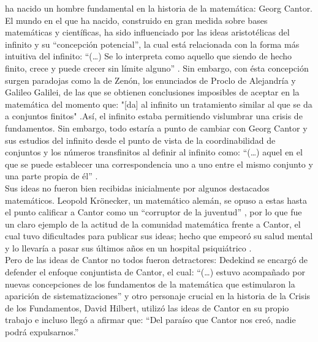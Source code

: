 \documentclass[a4paper,11pt]{article}
\begin{document}
ha nacido un hombre fundamental en la historia de la matemática: Georg Cantor. El mundo en el que ha nacido, construido en gran medida sobre bases matemáticas y científicas, ha sido influenciado por las ideas aristotélicas del infinito y su “concepción potencial”\cite{crespo2006paseo}, la cual está relacionada con la forma más intuitiva del infinito: “(…) Se lo interpreta como aquello que siendo de hecho finito, crece y puede crecer sin límite alguno” \cite[p.2]{crespo2006paseo}. Sin embargo, con ésta concepción surgen paradojas como la de Zenón, los enunciados de Proclo de Alejandría y Galileo Galilei, de las que se obtienen conclusiones imposibles de aceptar en la matemática del momento que: "[da] al infinito un tratamiento similar al que se da a conjuntos finitos" \cite[p.2]{crespo2006paseo}.Así, el infinito estaba permitiendo vislumbrar una crisis de fundamentos. Sin embargo, todo estaría a punto de cambiar con Georg Cantor y sus estudios del infinito desde el punto de vista de la coordinabilidad de conjuntos y los números transfinitos al definir al infinito como: “(…) aquel en el que se puede establecer una correspondencia uno a uno entre el mismo conjunto y una parte propia de él” \cite[p.5]{crespo2006paseo}. \\
Sus ideas no fueron bien recibidas inicialmente por algunos destacados matemáticos. Leopold Krönecker, un matemático alemán, se opuso a estas hasta el punto calificar a Cantor como un “corruptor de la juventud” \cite{crespo2006paseo}, por lo que fue un claro ejemplo de la actitud de la comunidad matemática frente a Cantor, el cual tuvo dificultades para publicar sus ideas; hecho que empeoró su salud mental y lo llevaría a pasar sus últimos años en un hospital psiquiátrico \cite{dusautoy_2018}. \\
Pero de las ideas de Cantor no todos fueron detractores: Dedekind se encargó de defender el enfoque conjuntista de Cantor, el cual: “(…) estuvo acompañado por nuevas concepciones de los fundamentos de la matemática que estimularon la aparición de sistematizaciones” \cite[p.5]{crespo2006paseo} y otro personaje crucial en la historia de la Crisis de los Fundamentos, David Hilbert, utilizó las ideas de Cantor en su propio trabajo e incluso llegó a afirmar que: “Del paraíso que Cantor nos
creó, nadie podrá expulsarnos.” \cite[p.5]{crespo2006paseo}
\end{document}
